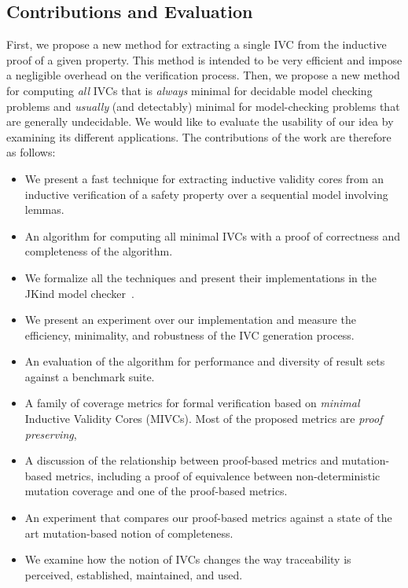\subsection{Contributions and Evaluation}
First, we propose a new method for extracting a single IVC from the inductive proof of a given property. This method is intended to be very efficient and impose a negligible overhead on the verification process.
Then, we propose a new method for computing \emph{all} IVCs that is {\em always} minimal for decidable model checking problems and {\em usually} (and detectably) minimal for model-checking problems that are generally undecidable. We would like to evaluate the usability of our idea by examining its different applications.
The contributions of the work are therefore as follows:
\begin{itemize}
    \item We present a fast technique for extracting inductive validity
      cores from an inductive verification of a safety property over a sequential model involving lemmas.
    \item An algorithm for computing all minimal IVCs with a proof of correctness and completeness of the algorithm.
    \item We formalize all the techniques and present their implementations in the JKind model checker~\cite{jkind}.
    \item We present an experiment over our implementation and measure the efficiency, minimality, and robustness of the IVC generation process.
    \item An evaluation of the algorithm for performance and diversity of result sets against a benchmark suite.
   \item A family of coverage metrics for formal verification based on \emph{minimal} Inductive Validity Cores (MIVCs).  Most of the proposed metrics are {\em proof preserving},
\item A discussion of the relationship between proof-based metrics and mutation-based metrics, including a proof of equivalence between non-deterministic mutation coverage and one of the proof-based metrics.
\item An experiment that compares our proof-based metrics against a state of the art mutation-based notion of completeness.
    \item We examine how the notion of IVCs changes the way traceability is perceived, established, maintained, and used.
\end{itemize}


